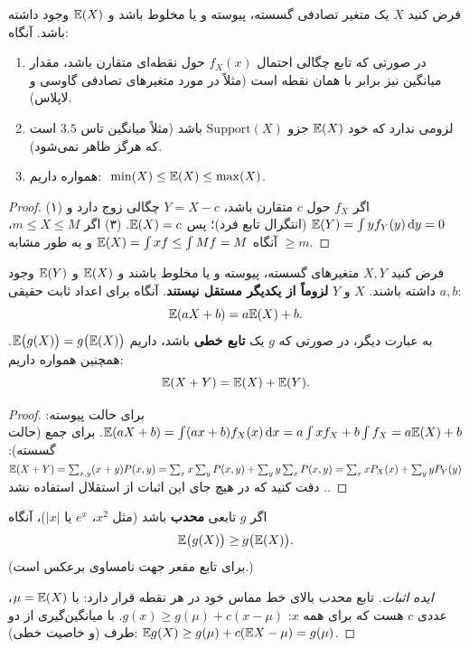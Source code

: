 \begin{theorem}
فرض کنید $X$ یک متغیر تصادفی گسسته، پیوسته و یا مخلوط باشد و $\mathbb{E}(X)$ وجود داشته باشد. آنگاه:
\begin{enumerate}
\item در صورتی که تابع چگالی احتمال $f_X(x)$ حول نقطه‌ای متقارن باشد، مقدار میانگین نیز برابر با همان نقطه است (مثلاً در مورد متغیرهای تصادفی \textcolor{blue!60!black}{گاوسی} و \textcolor{blue!60!black}{لاپلاس}).
\item لزومی ندارد که خود $\mathbb{E}(X)$ جزو $\mathrm{Support}(X)$ باشد (مثلاً میانگین تاس $3.5$ است که هرگز ظاهر نمی‌شود).
\item همواره داریم: $\ \min(X)\le\E(X)\le\max(X)$.
\end{enumerate}
\end{theorem}
\begin{proof}
(۱) اگر $f_X$ حول $c$ متقارن باشد، $Y=X-c$ چگالی زوج دارد و $\mathbb{E}(Y)=\int yf_Y(y)\,\mathrm{d} y=0$ (انتگرال تابع فرد)؛ پس $\mathbb{E}(X)=c$.
(۳) اگر $m\le X\le M$، آنگاه $\mathbb{E}(X)=\int xf\le\int Mf=M$ و به طور مشابه $\ge m$.
\end{proof}

\begin{theorem}
فرض کنید $X,Y$ متغیرهای گسسته، پیوسته و یا مخلوط باشند و $\mathbb{E}(X)$ و $\mathbb{E}(Y)$ وجود داشته باشند. $X$ و $Y$ \textcolor{red!70!black}{\textbf{لزوماً از یکدیگر مستقل نیستند}}. آنگاه برای اعداد ثابت حقیقی $a,b$:
\[
\mathbb{E}(aX+b)=a\mathbb{E}(X)+b .
\]
به عبارت دیگر، در صورتی که $g$ یک \textbf{تابع خطی} باشد، داریم $\mathbb{E}\big(g(X)\big)=g\big(\mathbb{E}(X)\big)$. همچنین همواره داریم:
\[
\mathbb{E}(X+Y)=\mathbb{E}(X)+\mathbb{E}(Y).
\]
\end{theorem}
\begin{proof}
برای حالت پیوسته: $\mathbb{E}(aX+b)=\int(ax+b)f_X(x)\,\mathrm{d} x=a\int xf_X+b\int f_X=a\mathbb{E}(X)+b$.
برای جمع (حالت گسسته): $\mathbb{E}(X+Y)=\sum_{x,y}(x+y)P(x,y)=\sum_xx\sum_yP(x,y)+\sum_yy\sum_xP(x,y)=\sum_xxP_X(x)+\sum_yyP_Y(y)$. دقت کنید که در هیچ جای این اثبات از استقلال استفاده نشد.
\end{proof}

\begin{theorem}
اگر $g$ تابعی \textbf{محدب} باشد (مثل $x^2$، $e^x$ یا $|x|$)، آنگاه
\[
\mathbb{E}\big(g(X)\big)\ge g\big(\mathbb{E}(X)\big).
\]
(برای تابع مقعر جهت نامساوی برعکس است.)
\end{theorem}
\begin{proof}[ایده اثبات]
تابع محدب بالای خط مماس خود در هر نقطه قرار دارد: با $\mu=\mathbb{E}(X)$، عددی $c$ هست که برای همه $x$: $g(x)\ge g(\mu)+c(x-\mu)$. با میانگین‌گیری از دو طرف (و خاصیت خطی): $\mathbb{E} g(X)\ge g(\mu)+c(\mathbb{E} X-\mu)=g(\mu)$.
\end{proof}

